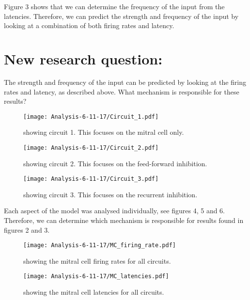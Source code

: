 \documentclass[11pt]{report}
\begin{document}
Figure 3 shows that we can determine the frequency of the input from the latencies. Therefore, we can predict the strength and frequency of the input by looking at a combination of both firing rates and latency.

\section*{New research question:}
The strength and frequency of the input can be predicted by looking at the firing rates and latency, as described above. What mechanism is responsible for these results?

\begin{figure}[!ht]
\centering
\texttt{[image: Analysis-6-11-17/Circuit\_1.pdf]}
\caption{showing circuit 1. This focuses on the mitral cell only.}
\end{figure} 

\begin{figure}[!h]
\centering
\texttt{[image: Analysis-6-11-17/Circuit\_2.pdf]}
\caption{showing circuit 2. This focuses on the feed-forward inhibition.}
\end{figure} 
\newpage

\begin{figure}[!ht]
\centering
\texttt{[image: Analysis-6-11-17/Circuit\_3.pdf]}
\caption{showing circuit 3. This focuses on the recurrent inhibition.}
\end{figure} 

Each aspect of the model was analysed individually, see figures 4, 5 and 6. Therefore, we can determine which mechanism is responsible for results found in figures 2 and 3.
\newpage

\begin{figure}[!ht]
\centering
\texttt{[image: Analysis-6-11-17/MC\_firing\_rate.pdf]}
\caption{showing the mitral cell firing rates for all circuits.}
\end{figure} 

\begin{figure}[!ht]
\centering
\texttt{[image: Analysis-6-11-17/MC\_latencies.pdf]}
\caption{showing the mitral cell latencies for all circuits.}
\end{figure} 
\end{document}
